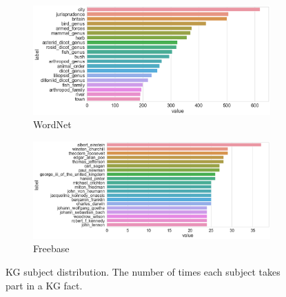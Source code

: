 \begin{figure}[H]
	\begin{subfigure}[b]{.5\linewidth}
   		\centering
    		\includegraphics[width=1.0\linewidth, height=0.7\linewidth]{Wordnet_Subject_Counts}
		\captionsetup{justification=centering}
		\caption{WordNet}
	\end{subfigure}
	\begin{subfigure}[b]{.5\linewidth}
   		\centering
		\includegraphics[width=1.0\linewidth, height=0.7\linewidth]{Freebase_Subject_Counts}
		\captionsetup{justification=centering}
		\caption{Freebase}
	\end{subfigure}
	\captionsetup{justification=centering}
	\caption{KG subject distribution. The number of times each subject takes part in a KG fact.}
\end{figure}

